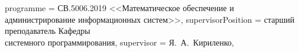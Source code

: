 {	%
	programme          = {СВ.5006.2019 <<Математическое обеспечение и администрирование информационных систем>>},
	supervisorPosition = {старший преподаватель Кафедры\\системного программирования}, %
	supervisor         = {Я.~А.~Кириленко},
}

